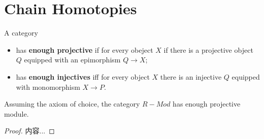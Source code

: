 \documentclass[Total.tex]{subfiles}
\begin{document}
		\section{Chain Homotopies}
			\begin{Def}
				A category 
				\begin{itemize}
					\item has \textbf{enough projective} if for every obeject $X$ if there is a projective object $Q$ equipped with an epimorphism $Q\rightarrow X$;
					\item has \textbf{enough injectives} iff for every object $X$ there is an injective $Q$ equipped with monomorphism $X\rightarrow P$. 
				\end{itemize}
			\end{Def}
			\begin{proposition}
				Assuming the axiom of choice, the category $R-Mod$ has enough projective module.
			\end{proposition}
			\begin{proof}
				内容...
			\end{proof}
\end{document}
